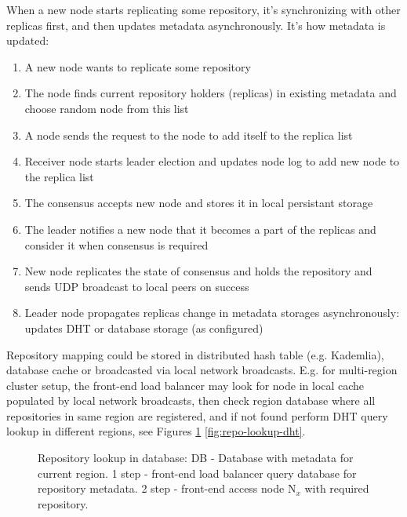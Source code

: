 \documentclass[nonacm=true]{acmart}
\begin{document}
When a new node starts replicating some repository, it's synchronizing with other replicas first, and then
updates metadata asynchronously. It's how metadata is updated:
\begin{enumerate}
  \item A new node wants to replicate some repository
  \item The node finds current repository holders (replicas) in existing metadata and choose random node from this list
  \item A node sends the request to the node to add itself to the replica list
  \item Receiver node starts leader election and updates node log to add new node to the replica list
  \item The consensus accepts new node and stores it in local persistant storage
  \item The leader notifies a new node that it becomes a part of the replicas and consider it when consensus is required
  \item New node replicates the state of consensus and holds the repository and sends UDP broadcast to
    local peers on success
  \item Leader node propagates replicas change in metadata storages asynchronously: updates DHT or database storage
    (as configured)
\end{enumerate}

Repository mapping could be stored in distributed hash table (e.g. Kademlia),
database cache or broadcasted via local network broadcasts.
E.g. for multi-region cluster setup, the front-end load balancer may look for node in local cache
populated by local network broadcasts, then check region database where all repositories in same region are
registered, and if not found perform DHT query lookup in different regions,
see Figures \ref{fig:repo-lookup-db} \ref{fig:repo-lookup-dht}.

\begin{figure}
  \begin{center}
  \end{center}
  \caption{
    Repository lookup in database:
    DB - Database with metadata for current region.
    1 step - front-end load balancer query database for repository metadata.
    2 step - front-end access node N$_{x}$ with required repository.
  }
  \label{fig:repo-lookup-db}
\end{figure}
\end{document}
